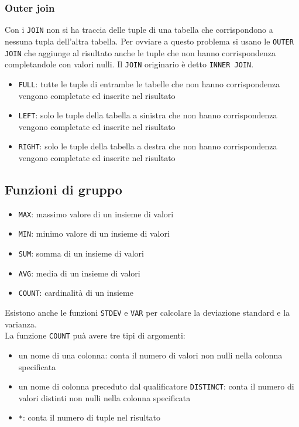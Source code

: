\documentclass[12pt, a4paper]{report}
\begin{document}
    \subsubsection{Outer join}
    Con i \texttt{JOIN} non si ha traccia delle tuple di una tabella che corrispondono a nessuna tupla dell'altra tabella. Per ovviare a questo problema si usano le \texttt{OUTER JOIN} che aggiunge al risultato anche le tuple che non hanno corrispondenza completandole con valori nulli. Il \texttt{JOIN} originario è detto \texttt{INNER JOIN}.
    \begin{itemize}
        \item \texttt{FULL}: tutte le tuple di entrambe le tabelle che non hanno corrispondenza vengono completate ed inserite nel risultato
        \item \texttt{LEFT}: solo le tuple della tabella a sinistra che non hanno corrispondenza vengono completate ed inserite nel risultato
        \item \texttt{RIGHT}: solo le tuple della tabella a destra che non hanno corrispondenza vengono completate ed inserite nel risultato
    \end{itemize}
    \subsection{Funzioni di gruppo}
    \begin{itemize}
        \item \texttt{MAX}: massimo valore di un insieme di valori
        \item \texttt{MIN}: minimo valore di un insieme di valori
        \item \texttt{SUM}: somma di un insieme di valori
        \item \texttt{AVG}: media di un insieme di valori
        \item \texttt{COUNT}: cardinalità di un insieme
    \end{itemize}
    Esistono anche le funzioni \texttt{STDEV} e \texttt{VAR} per calcolare la deviazione standard e la varianza.\\
    La funzione \texttt{COUNT} puà avere tre tipi di argomenti:
    \begin{itemize}
        \item un nome di una colonna: conta il numero di valori non nulli nella colonna specificata
        \item un nome di colonna preceduto dal qualificatore \texttt{DISTINCT}: conta il numero di valori distinti non nulli nella colonna specificata
        \item \texttt{*}: conta il numero di tuple nel risultato
    \end{itemize}
\end{document}
